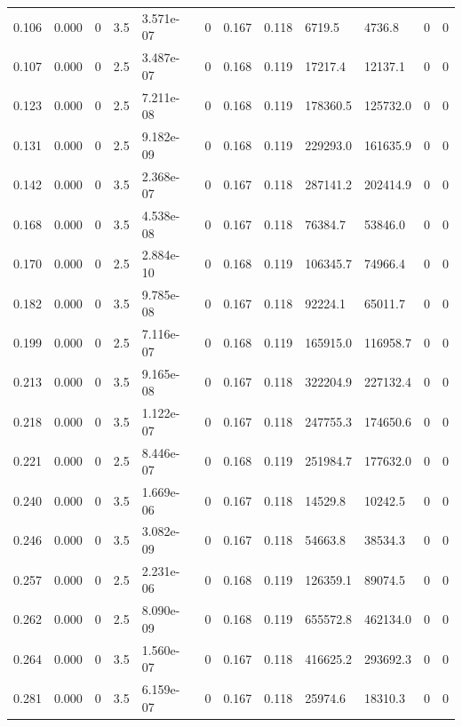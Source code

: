 \documentclass[preview]{standalone}
\begin{document}
{{\begin{tabular}{L{1.2cm}C{1.2cm} C{0.3cm}C{0.5cm} C{1.4cm}C{1.4cm} C{1.4cm}C{1.4cm} C{1.6cm}C{1.6cm} C{1.6cm}C{1.6cm}}
  0.106  &  0.000  & 0     & 3.5 &  3.571e-07  & 0  &  0.167&   0.118& 6719.5 & 4736.8   &  0 & 0  \\ 
  0.107  &  0.000  & 0     & 2.5 &  3.487e-07  & 0  &  0.168&   0.119& 17217.4 & 12137.1   &  0 & 0  \\ 
  0.123  &  0.000  & 0     & 2.5 &  7.211e-08  & 0  &  0.168&   0.119& 178360.5 & 125732.0   &  0 & 0  \\ 
  0.131  &  0.000  & 0     & 2.5 &  9.182e-09  & 0  &  0.168&   0.119& 229293.0 & 161635.9   &  0 & 0  \\ 
  0.142  &  0.000  & 0     & 3.5 &  2.368e-07  & 0  &  0.167&   0.118& 287141.2 & 202414.9   &  0 & 0  \\ 
  0.168  &  0.000  & 0     & 3.5 &  4.538e-08  & 0  &  0.167&   0.118& 76384.7 & 53846.0   &  0 & 0  \\ 
  0.170  &  0.000  & 0     & 2.5 &  2.884e-10  & 0  &  0.168&   0.119& 106345.7 & 74966.4   &  0 & 0  \\ 
  0.182  &  0.000  & 0     & 3.5 &  9.785e-08  & 0  &  0.167&   0.118& 92224.1 & 65011.7   &  0 & 0  \\ 
  0.199  &  0.000  & 0     & 2.5 &  7.116e-07  & 0  &  0.168&   0.119& 165915.0 & 116958.7   &  0 & 0  \\ 
  0.213  &  0.000  & 0     & 3.5 &  9.165e-08  & 0  &  0.167&   0.118& 322204.9 & 227132.4   &  0 & 0  \\ 
  0.218  &  0.000  & 0     & 3.5 &  1.122e-07  & 0  &  0.167&   0.118& 247755.3 & 174650.6   &  0 & 0  \\ 
  0.221  &  0.000  & 0     & 2.5 &  8.446e-07  & 0  &  0.168&   0.119& 251984.7 & 177632.0   &  0 & 0  \\ 
  0.240  &  0.000  & 0     & 3.5 &  1.669e-06  & 0  &  0.167&   0.118& 14529.8 & 10242.5   &  0 & 0  \\ 
  0.246  &  0.000  & 0     & 3.5 &  3.082e-09  & 0  &  0.167&   0.118& 54663.8 & 38534.3   &  0 & 0  \\ 
  0.257  &  0.000  & 0     & 2.5 &  2.231e-06  & 0  &  0.168&   0.119& 126359.1 & 89074.5   &  0 & 0  \\ 
  0.262  &  0.000  & 0     & 2.5 &  8.090e-09  & 0  &  0.168&   0.119& 655572.8 & 462134.0   &  0 & 0  \\ 
  0.264  &  0.000  & 0     & 3.5 &  1.560e-07  & 0  &  0.167&   0.118& 416625.2 & 293692.3   &  0 & 0  \\ 
  0.281  &  0.000  & 0     & 3.5 &  6.159e-07  & 0  &  0.167&   0.118& 25974.6 & 18310.3   &  0 & 0  \\ 

\end{tabular}}}
\end{document}
